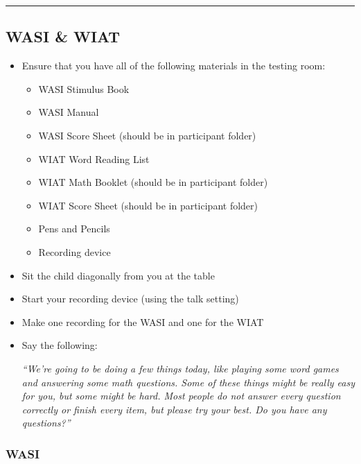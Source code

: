 \documentclass[]{book}
\providecommand{\tightlist}{%
  \setlength{\itemsep}{0pt}\setlength{\parskip}{0pt}}
\begin{document}
\begin{center}\rule{0.5\linewidth}{0.5pt}\end{center}

\hypertarget{wasi-wiat}{%
\subsection{WASI \& WIAT}\label{wasi-wiat}}

\begin{itemize}
\item
  Ensure that you have all of the following materials in the testing room:

  \begin{itemize}
  \tightlist
  \item
    WASI Stimulus Book
  \item
    WASI Manual
  \item
    WASI Score Sheet (should be in participant folder)
  \item
    WIAT Word Reading List
  \item
    WIAT Math Booklet (should be in participant folder)
  \item
    WIAT Score Sheet (should be in participant folder)
  \item
    Pens and Pencils
  \item
    Recording device
  \end{itemize}
\item
  Sit the child diagonally from you at the table
\item
  Start your recording device (using the talk setting)
\item
  Make one recording for the WASI and one for the WIAT
\item
  Say the following:

  \emph{``We're going to be doing a few things today, like playing some word games and answering some math questions. Some of these things might be really easy for you, but some might be hard. Most people do not answer every question correctly or finish every item, but please try your best. Do you have any questions?''}
\end{itemize}

\hypertarget{wasi}{%
\subsubsection{WASI}\label{wasi}}
\end{document}
